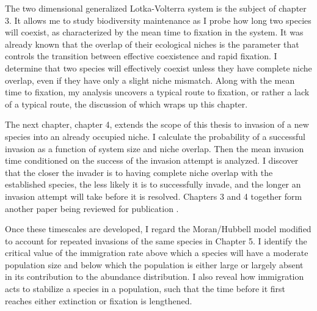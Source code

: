 The two dimensional generalized Lotka-Volterra system is the subject of chapter 3. 
It allows me to study biodiversity maintenance as I probe how long two species will coexist, as characterized by the mean time to fixation in the system. 
It was already known that the overlap of their ecological niches is the parameter that controls the transition between effective coexistence and rapid fixation. 
I determine that two species will effectively coexist unless they have complete niche overlap, even if they have only a slight niche mismatch. %
Along with the mean time to fixation, my analysis uncovers a typical route to fixation, or rather a lack of a typical route, the discussion of which wraps up this chapter. %

The next chapter, chapter 4, extends the scope of this thesis to invasion of a new species into an already occupied niche. 
I calculate the probability of a successful invasion as a function of system size and niche overlap. 
Then the mean invasion time conditioned on the success of the invasion attempt is analyzed. 
I discover that the closer the invader is to having complete niche overlap with the established species, the less likely it is to successfully invade, and the longer an invasion attempt will take before it is resolved. %
Chapters 3 and 4 together form another paper being reviewed for publication \cite{Badali2019a}. 

Once these timescales are developed, I regard the Moran/Hubbell model modified to account for repeated invasions of the same species in Chapter 5. 
I identify the critical value of the immigration rate above which a species will have a moderate population size and below which the population is either large or largely absent in its contribution to the abundance distribution. %
I also reveal how immigration acts to stabilize a species in a population, such that the time before it first reaches either extinction or fixation is lengthened. %

